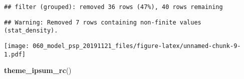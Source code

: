 \documentclass[
]{article}
\newenvironment{Shaded}{\begin{snugshade}}{\end{snugshade}}
\newcommand{\DataTypeTok}[1]{\textcolor[rgb]{0.13,0.29,0.53}{#1}}
\newcommand{\DecValTok}[1]{\textcolor[rgb]{0.00,0.00,0.81}{#1}}
\newcommand{\KeywordTok}[1]{\textcolor[rgb]{0.13,0.29,0.53}{\textbf{#1}}}
\newcommand{\NormalTok}[1]{#1}
\newcommand{\OperatorTok}[1]{\textcolor[rgb]{0.81,0.36,0.00}{\textbf{#1}}}
\newcommand{\StringTok}[1]{\textcolor[rgb]{0.31,0.60,0.02}{#1}}
\begin{document}
\begin{Shaded}
\end{Shaded}

\begin{verbatim}
## filter (grouped): removed 36 rows (47%), 40 rows remaining
\end{verbatim}

\begin{verbatim}
## Warning: Removed 7 rows containing non-finite values (stat_density).
\end{verbatim}

\texttt{[image: 060\_model\_psp\_20191121\_files/figure-latex/unnamed-chunk-9-1.pdf]}

\begin{Shaded}
\begin{Highlighting}[]
  \KeywordTok{theme_ipsum_rc}\NormalTok{()}
\end{Highlighting}
\end{Shaded}
\end{document}
